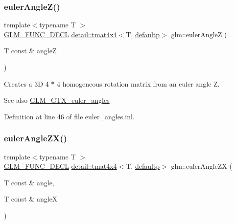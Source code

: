 \subsubsection{\texorpdfstring{euler\+Angle\+Z()}{eulerAngleZ()}}
{\footnotesize\ttfamily template$<$typename T $>$ \\
\hyperlink{setup_8hpp_ab2d052de21a70539923e9bcbf6e83a51}{G\+L\+M\+\_\+\+F\+U\+N\+C\+\_\+\+D\+E\+CL} \hyperlink{structglm_1_1detail_1_1tmat4x4}{detail\+::tmat4x4}$<$T, \hyperlink{namespaceglm_a0f04f086094c747d227af4425893f545a9d21ccd8b5a009ec7eb7677befc3bf51}{defaultp}$>$ glm\+::euler\+AngleZ (\begin{DoxyParamCaption}\item[{T const \&}]{angleZ }\end{DoxyParamCaption})}

Creates a 3D 4 $\ast$ 4 homogeneous rotation matrix from an euler angle Z. \begin{DoxySeeAlso}{See also}
\hyperlink{group__gtx__euler__angles}{G\+L\+M\+\_\+\+G\+T\+X\+\_\+euler\+\_\+angles} 
\end{DoxySeeAlso}


Definition at line 46 of file euler\+\_\+angles.\+inl.

\mbox{\label{group__gtx__euler__angles_ga5766bbe3f5b17b5c33ed21b2933ff278}} 
\subsubsection{\texorpdfstring{euler\+Angle\+Z\+X()}{eulerAngleZX()}}
{\footnotesize\ttfamily template$<$typename T $>$ \\
\hyperlink{setup_8hpp_ab2d052de21a70539923e9bcbf6e83a51}{G\+L\+M\+\_\+\+F\+U\+N\+C\+\_\+\+D\+E\+CL} \hyperlink{structglm_1_1detail_1_1tmat4x4}{detail\+::tmat4x4}$<$T, \hyperlink{namespaceglm_a0f04f086094c747d227af4425893f545a9d21ccd8b5a009ec7eb7677befc3bf51}{defaultp}$>$ glm\+::euler\+Angle\+ZX (\begin{DoxyParamCaption}\item[{T const \&}]{angle,  }\item[{T const \&}]{angleX }\end{DoxyParamCaption})}


